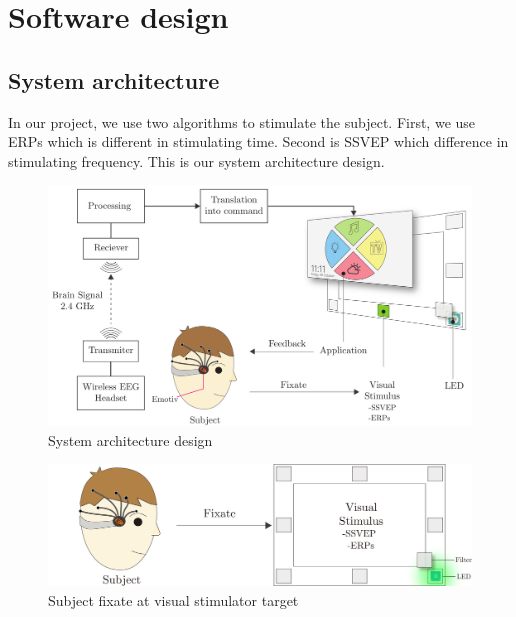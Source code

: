 \chapter{Software design}

\label{ch:Software design}

\setlength{\parindent}{4em}
\setlength{\parskip}{1em}
\renewcommand{\baselinestretch}{1.5}

\section{System architecture}

\hspace{1.5cm}In our project, we use two algorithms to stimulate the subject. First, we use ERPs which is different in stimulating time. Second is SSVEP which difference in stimulating frequency. This is our system architecture design.

\begin{figure}[ht]
	\centering
	\includegraphics[scale = 0.28]{chapter5/architec.pdf}
	\caption{System architecture design}
\end{figure}

\begin{figure}[ht]
	\centering
	\includegraphics[scale = 0.33]{chapter5/frame_led.pdf}
	\caption{Subject fixate at visual stimulator target}
\end{figure}

